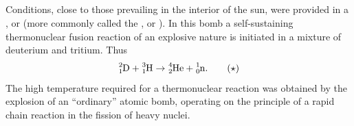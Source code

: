 
\subsection{}\label{42.9.15} Conditions, close to those prevailing in the interior of
the sun, were provided in a , or  (more commonly called the , or ). In this bomb
a self-sustaining thermonuclear fusion reaction of an explosive nature is initiated in a mixture of deuterium and tritium. Thus
\begin{equation*}%
\ce{^{2}_{1}D}  + \ce{^{3}_{1}H}  \to \ce{^{4}_{2}He} +  \ce{^{1}_{0}n}. \tag{$\star$}
\end{equation*}
The high temperature required for a thermonuclear reaction
was obtained by the explosion of an ``ordinary'' atomic bomb, operating on the principle of a rapid chain reaction in the fission of heavy nuclei.

